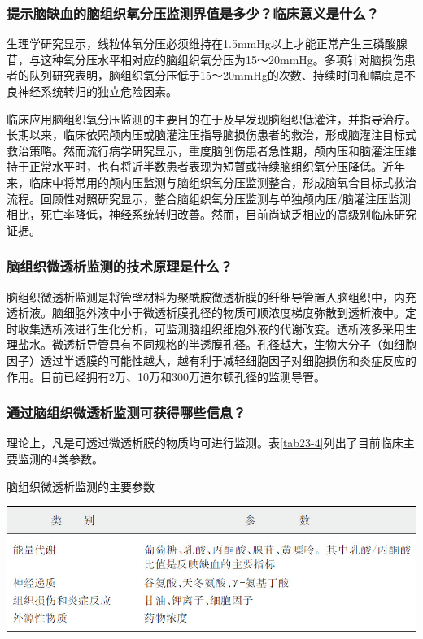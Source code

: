 \subsubsection{提示脑缺血的脑组织氧分压监测界值是多少？临床意义是什么？}

生理学研究显示，线粒体氧分压必须维持在1.5mmHg以上才能正常产生三磷酸腺苷，与这种氧分压水平相对应的脑组织氧分压为15～20mmHg。多项针对脑损伤患者的队列研究表明，脑组织氧分压低于15～20mmHg的次数、持续时间和幅度是不良神经系统转归的独立危险因素。

临床应用脑组织氧分压监测的主要目的在于及早发现脑组织低灌注，并指导治疗。长期以来，临床依照颅内压或脑灌注压指导脑损伤患者的救治，形成脑灌注目标式救治策略。然而流行病学研究显示，重度脑创伤患者急性期，颅内压和脑灌注压维持于正常水平时，也有将近半数患者表现为短暂或持续脑组织氧分压降低。近年来，临床中将常用的颅内压监测与脑组织氧分压监测整合，形成脑氧合目标式救治流程。回顾性对照研究显示，整合脑组织氧分压监测与单独颅内压/脑灌注压监测相比，死亡率降低，神经系统转归改善。然而，目前尚缺乏相应的高级别临床研究证据。

\subsubsection{脑组织微透析监测的技术原理是什么？}

脑组织微透析监测是将管壁材料为聚酰胺微透析膜的纤细导管置入脑组织中，内充透析液。脑细胞外液中小于微透析膜孔径的物质可顺浓度梯度弥散到透析液中。定时收集透析液进行生化分析，可监测脑组织细胞外液的代谢改变。透析液多采用生理盐水。微透析导管具有不同规格的半透膜孔径。孔径越大，生物大分子（如细胞因子）透过半透膜的可能性越大，越有利于减轻细胞因子对细胞损伤和炎症反应的作用。目前已经拥有2万、10万和300万道尔顿孔径的监测导管。

\subsubsection{通过脑组织微透析监测可获得哪些信息？}

理论上，凡是可透过微透析膜的物质均可进行监测。表\ref{tab23-4}列出了目前临床主要监测的4类参数。

\begin{table}[htbp]
\centering
\caption{脑组织微透析监测的主要参数}
\label{tab23-4}
\includegraphics{./images/Image00273.jpg}
\end{table}


